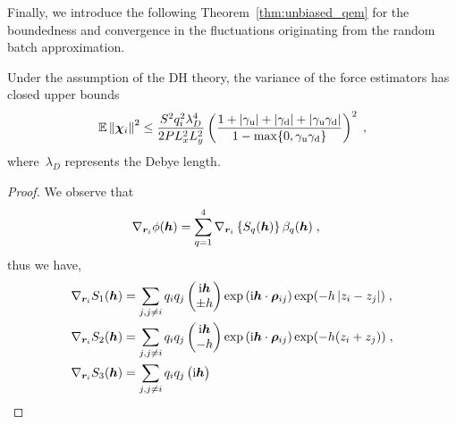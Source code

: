 Finally, we introduce the following Theorem~\ref{thm:unbiased_qem} for the boundedness and convergence in the fluctuations originating from the random batch approximation.
\begin{thm}\label{thm:unbiased_qem}
	Under the assumption of the DH theory, the variance of the force estimators has closed upper bounds
	\begin{equation}
		  \mathbb{E}\left\lVert\boldsymbol{\chi}_{i}\right\rVert^2\leq\frac{ S^2q_i^2\lambda_{D}^4}{2P L_x^2L_y^2}\left( \frac{1+\left\lvert\gamma_{\mathrm{u}}\right\rvert+\left\lvert\gamma_{\mathrm{d}}\right\rvert+\left\lvert\gamma_{\mathrm{u}}\gamma_{\mathrm{d}}\right\rvert}{1-\max\{0,\gamma_{\mathrm{u}}\gamma_{\mathrm{d}}\}}\right)^2\;,
	\end{equation}
     where~$\lambda_{D}$  represents the Debye length.
\end{thm}
\begin{proof}
We observe that 
\begin{align*}
 \nabla_{\bm{r}_i}\phi(\boldsymbol{h})&=   \sum_{q=1}^4 \nabla_{\bm{r}_i}\left\{S_q(\boldsymbol{h})\right\}\beta_q(\boldsymbol{h})\;,
\end{align*}
thus we have,
%
%
\begin{align*}
 \nabla_{\bm{r}_i} S_1(\boldsymbol{h})&=\sum_{j,j\neq i}q_iq_j   \begin{pmatrix} \mathrm{i} \boldsymbol{h} \\
 \pm h  \end{pmatrix}\exp{(\mathrm{i} \boldsymbol{h} \cdot \boldsymbol{\rho}_{ij})}\exp(-h\left\lvert z_i-z_j\right\rvert)\;,\\
 \nabla_{\bm{r}_i} S_2(\boldsymbol{h})&=\sum_{j,j\neq i}q_iq_j   \begin{pmatrix} \mathrm{i} \boldsymbol{h} \\
 -h  \end{pmatrix}\exp{(\mathrm{i} \boldsymbol{h} \cdot \boldsymbol{\rho}_{ij})}\exp(-h(z_i+z_j))\;,\\
  \nabla_{\bm{r}_i} S_3(\boldsymbol{h})&=\sum_{j,j\neq i}q_iq_j   \begin{pmatrix} \mathrm{i} \boldsymbol{h} \\

\end{pmatrix}
\end{align*}
\end{proof}
